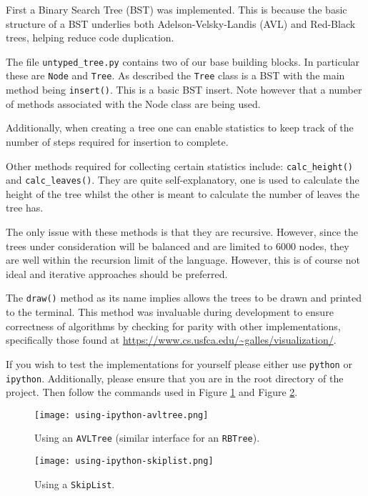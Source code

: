 \documentclass[article]{uom-coursework}
\begin{document}
First a Binary Search Tree (BST) was implemented. This is
because the basic structure of a BST underlies both
Adelson-Velsky-Landis (AVL) and Red-Black trees, helping reduce
code duplication.

The file \texttt{untyped\_tree.py} contains two of our base
building blocks. In particular these are \texttt{Node} and
\texttt{Tree}. As described the \texttt{Tree} class is a BST
with the main method being \texttt{insert()}. This is a basic
BST insert. Note however that a number of methods associated
with the Node class are being used.

Additionally, when creating a tree one can enable statistics to
keep track of the number of steps required for insertion to
complete.

Other methods required for collecting certain statistics
include: \texttt{calc\_height()} and \texttt{calc\_leaves()}.
They are quite self-explanatory, one is used to calculate the
height of the tree whilst the other is meant to calculate the
number of leaves the tree has.

The only issue with these methods is that they are recursive.
However, since the trees under consideration will be balanced
and are limited to 6000 nodes, they are well within the
recursion limit of the language. However, this is of course not
ideal and iterative approaches should be preferred.

The \texttt{draw()} method as its name implies allows the trees
to be drawn and printed to the terminal. This method was
invaluable during development to ensure correctness of
algorithms by checking for parity with other implementations,
specifically those found at
\url{https://www.cs.usfca.edu/~galles/visualization/}.

If you wish to test the implementations for yourself please
either use \texttt{python} or \texttt{ipython}. Additionally,
please ensure that you are in the root directory of the project.
Then follow the commands used in Figure \ref{fig:ipythonavl} and
Figure \ref{fig:ipythonskip}.


\begin{figure}[H]
\centering
\texttt{[image: using-ipython-avltree.png]}
\caption{Using an \texttt{AVLTree} (similar
interface for an \texttt{RBTree}).}
\label{fig:ipythonavl}
\end{figure}

\begin{figure}[H]
\centering
\texttt{[image: using-ipython-skiplist.png]}
\caption{Using a \texttt{SkipList}.}
\label{fig:ipythonskip}
\end{figure}
\end{document}
